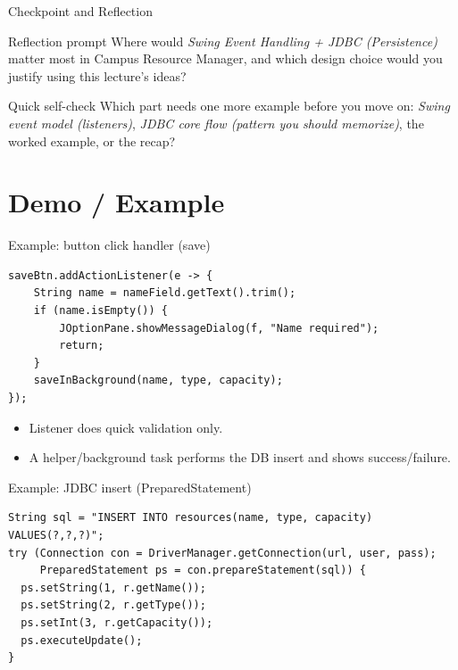 \documentclass{beamer}
\begin{document}
\begin{frame}{Checkpoint and Reflection}
\begin{block}{Reflection prompt}
Where would \textit{Swing Event Handling + JDBC (Persistence)} matter most in Campus Resource Manager, and which design choice would you justify using this lecture's ideas?
\end{block}
\begin{block}{Quick self-check}
Which part needs one more example before you move on: \textit{Swing event model (listeners)}, \textit{JDBC core flow (pattern you should memorize)}, the worked example, or the recap?
\end{block}
  \slidesources{\OOPSUnitIVSources}
\end{frame}

\section{Demo / Example}
\label{sec:demo}

\begin{frame}[fragile,shrink=8]{Example: button click handler (save)}
\begin{lstlisting}
saveBtn.addActionListener(e -> {
    String name = nameField.getText().trim();
    if (name.isEmpty()) {
        JOptionPane.showMessageDialog(f, "Name required");
        return;
    }
    saveInBackground(name, type, capacity);
});
\end{lstlisting}
  \begin{itemize}[<+->]
    \item Listener does quick validation only.
    \item A helper/background task performs the DB insert and shows success/failure.
  \end{itemize}
  \slidesources{\OOPSUnitIVSources}
\end{frame}

\begin{frame}[fragile]{Example: JDBC insert (PreparedStatement)}
\begin{lstlisting}
String sql = "INSERT INTO resources(name, type, capacity) VALUES(?,?,?)";
try (Connection con = DriverManager.getConnection(url, user, pass);
     PreparedStatement ps = con.prepareStatement(sql)) {
  ps.setString(1, r.getName());
  ps.setString(2, r.getType());
  ps.setInt(3, r.getCapacity());
  ps.executeUpdate();
}
\end{lstlisting}
  \slidesources{\OOPSUnitIVSources}
\end{frame}
\end{document}

